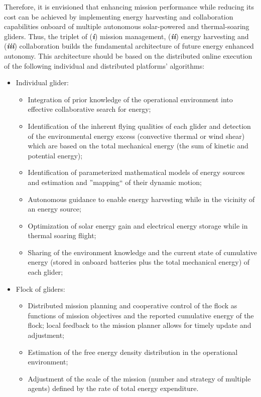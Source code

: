 \documentclass{ifacconf}
\begin{document}
Therefore, it is envisioned that enhancing mission performance while reducing its cost can be achieved by implementing energy harvesting and collaboration capabilities onboard of multiple autonomous solar-powered and thermal-soaring gliders. Thus, the triplet of (\emph{\textbf{i}}) mission management, (\emph{\textbf{ii}}) energy harvesting and (\emph{\textbf{iii}}) collaboration builds the fundamental architecture of future energy enhanced autonomy.  This architecture should be based on the distributed online execution of the following individual and distributed platforms' algorithms:
\begin{itemize}[leftmargin=0.35cm]
 \item Individual glider:
 \begin{itemize}[leftmargin=0.25cm]
 \item Integration of prior knowledge of the operational environment into effective collaborative search for energy;
 \item Identification of the inherent flying qualities of each glider and detection of the environmental energy excess (convective thermal or wind shear) which are based on the total mechanical energy (the sum of kinetic and potential energy);
 \item Identification of parameterized mathematical models of energy sources and estimation and ''mapping`` of their dynamic motion;
 \item Autonomous guidance to enable energy harvesting while in the vicinity of an energy source;
 \item Optimization of solar energy gain and electrical energy storage while in thermal soaring flight;
 \item Sharing of the environment knowledge and the current state of cumulative energy (stored in onboard batteries plus the total mechanical energy) of each glider;
 \end{itemize}
\item Flock of gliders:
\begin{itemize}[leftmargin=0.25cm]
  \item Distributed mission planning and cooperative control of the flock as functions of mission objectives and the reported cumulative energy of the flock; local feedback to the mission planner allows for timely update and adjustment;
  \item Estimation of the free energy density distribution in the operational environment;
  \item Adjustment of the scale of the mission (number and strategy of multiple agents) defined by the rate of total energy expenditure.
\end{itemize}
\end{itemize}
\end{document}
